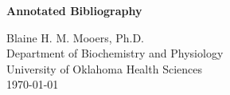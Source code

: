 \documentclass[11pt]{article}
\begin{document}
\begin{center}
{
\Large\textbf{Annotated Bibliography}
\medskip

   { \large   Blaine H. M. Mooers, Ph.D. \\
\medskip
Department of Biochemistry and Physiology \\
\medskip
University of Oklahoma Health Sciences \\
\medskip
\today}
}
\end{center}

\nocite{*}


\end{document}
